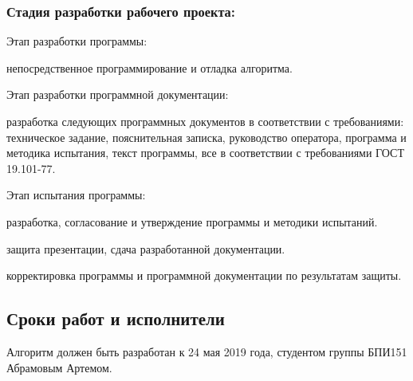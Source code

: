 \subsubsection{Стадия разработки рабочего проекта:}
\begin{my_enumerate}
\item Этап разработки программы:
    \begin{my_enumerate}
    \item непосредственное программирование и отладка алгоритма.
    \end{my_enumerate}
\item Этап разработки программной документации:
    \begin{my_enumerate}
    \item разработка следующих программных документов в соответствии с требованиями: техническое задание, пояснительная записка, руководство оператора, программа и методика испытания, текст программы, все в соответствии с требованиями ГОСТ 19.101-77.
    \end{my_enumerate}
\item Этап испытания программы:    
    \begin{my_enumerate}
    \item разработка, согласование и утверждение программы и методики испытаний.
    \item защита презентации, сдача разработанной документации.
    \item корректировка программы и программной документации по результатам защиты.
    \end{my_enumerate}
\end{my_enumerate}


\subsection{Сроки работ и исполнители}
Алгоритм должен быть разработан к 24 мая 2019 года, студентом группы БПИ151 Абрамовым Артемом.
